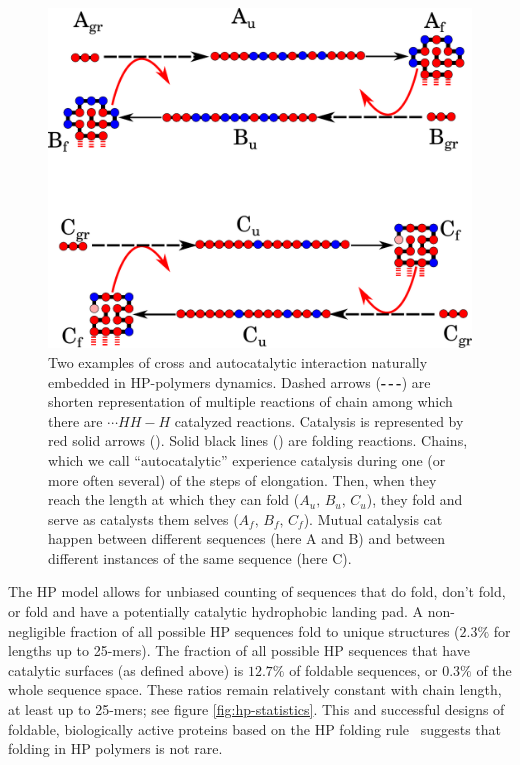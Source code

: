 \documentclass[journal=jacsat,manuscript=article,layout=twocolumn]{achemso}
\newcommand*{\red}[1]{\textcolor{red}{#1}}
\begin{document}
\begin{figure}[h!]
  \centering
  \includegraphics[width=0.9\columnwidth]{pictures/catalysis-kinEx-all.pdf}
  \caption{\footnotesize{Two examples of cross and autocatalytic interaction naturally embedded in 
HP-polymers dynamics. Dashed arrows (\textbf{-\,-\,-}) are shorten representation of multiple 
reactions of chain among which there are $\cdots HH - H$ catalyzed reactions. Catalysis is 
represented by red solid arrows (\red{\textbf{\textemdash}}). Solid black lines 
(\textbf{\textemdash}) are folding reactions. Chains, which we call ``autocatalytic'' experience 
catalysis during one (or more often several) of the steps of elongation. Then, when they reach the 
length at which they can fold ($A_u,\, B_u,\, C_u$), they fold and serve as catalysts them selves 
($A_f,\, B_f,\, C_f$). Mutual catalysis cat happen between different sequences (here A and B) and 
between different instances of the same sequence (here C).}}
  \label{fig:kinExamples}
\end{figure}

 The HP model allows for unbiased counting of sequences that do fold, don't fold, or fold and have 
a potentially catalytic hydrophobic landing pad.  A non-negligible fraction of all possible HP 
sequences fold to unique structures ($2.3\% $ for lengths up to 25-mers). The fraction of all 
possible HP sequences that have catalytic surfaces (as defined above) is $12.7\%$ of foldable 
sequences, or $0.3\%$ of the whole sequence space.  These ratios remain relatively constant with 
chain length, at least up to 25-mers; see figure \ref{fig:hp-statistics}.  This and successful 
designs of foldable, biologically active proteins based on the HP folding rule~\cite{Murphy2015} 
suggests that folding in HP polymers is not rare.  
 
\end{document}
